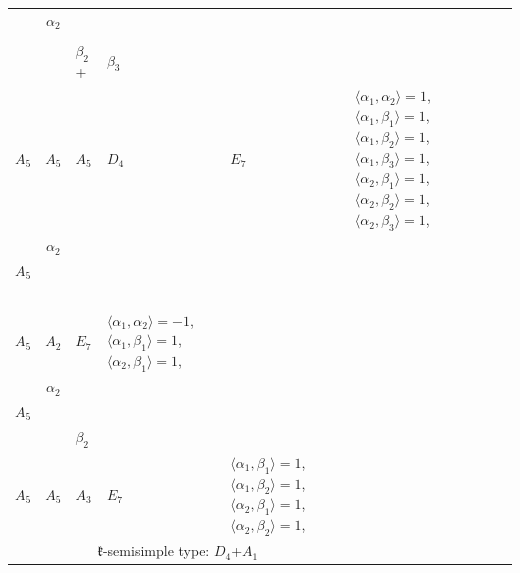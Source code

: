 \documentclass[12pt]{report}
\begin{document}
\begin{appendix}
{\begin{longtable}{rcl p{1cm}p{1cm}p{3cm} }
\hline\hline\begin{tabular}{cc}$\alpha_1$+ & $\alpha_2$\\\tiny{  } & \tiny{  }\end{tabular} &\begin{tabular}{c} = \\~ \end{tabular} & \begin{tabular}{ccc}$\beta_1$+ & $\beta_2$+ & $\beta_3$\\\tiny{ $A_5$ } & \tiny{ $A_5$ } & \tiny{ $A_5$ }\end{tabular} & $D_4$ & $E_7$ & $\langle\alpha_1, \alpha_2\rangle=1$,  $\langle\alpha_1, \beta_1\rangle=1$, $\langle\alpha_1, \beta_2\rangle=1$, $\langle\alpha_1, \beta_3\rangle=1$, $\langle\alpha_2, \beta_1\rangle=1$, $\langle\alpha_2, \beta_2\rangle=1$, $\langle\alpha_2, \beta_3\rangle=1$, 
\\
\begin{tabular}{cc}$\alpha_1$+ & $\alpha_2$\\\tiny{ $A_5$ } & \tiny{  }\end{tabular} &\begin{tabular}{c} = \\~ \end{tabular} & \begin{tabular}{c}$\beta_1$\\\tiny{ $A_5$ }\end{tabular} & $A_2$ & $E_7$ & $\langle\alpha_1, \alpha_2\rangle=-1$,  $\langle\alpha_1, \beta_1\rangle=1$, $\langle\alpha_2, \beta_1\rangle=1$, 
\\
\begin{tabular}{cc}$\alpha_1$+ & $\alpha_2$\\\tiny{ $A_5$ } & \tiny{  }\end{tabular} &\begin{tabular}{c} = \\~ \end{tabular} & \begin{tabular}{cc}$\beta_1$+ & $\beta_2$\\\tiny{ $A_5$ } & \tiny{ $A_5$ }\end{tabular} & $A_3$ & $E_7$ &  $\langle\alpha_1, \beta_1\rangle=1$, $\langle\alpha_1, \beta_2\rangle=1$, $\langle\alpha_2, \beta_1\rangle=1$, $\langle\alpha_2, \beta_2\rangle=1$, 
\\
\hline\multicolumn{5}{c}{$\mathfrak{k}$-semisimple type: $D_4$+$A_1$}\\

\end{longtable}}
\end{appendix}
\end{document}
